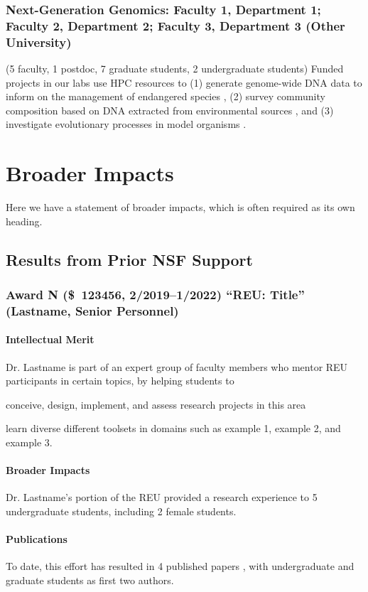 \documentclass[12pt]{nsf-proposal}
\newcommand{\dol}[2][]{\SI{#2}[\$]{#1}}
\begin{document}
\subsubsection{Next-Generation Genomics: Faculty 1, Department 1; Faculty 2, Department 2; Faculty 3, Department 3 (Other University)}

(5 faculty, 1 postdoc, 7 graduate students, 2 undergraduate students)
Funded projects in our labs use HPC resources to (1) generate genome-wide DNA data to inform on the management of endangered species \cite{torkamaneh2016}, (2) survey community composition based on DNA extracted from environmental sources \cite{watts2019}, and (3) investigate evolutionary processes in model organisms \cite{hurt2021}.

\section*{Broader Impacts}

Here we have a statement of broader impacts, which is often required as its own heading.

\subsection{Results from Prior NSF Support}

\subsubsection{Award N (\dol{123456}, 2/2019--1/2022) ``REU: Title'' (Lastname, Senior Personnel)}

\paragraph{Intellectual Merit}

Dr. Lastname is part of an expert group of faculty members who mentor REU participants in certain topics, by helping students to
\begin{enumerate*}[label=(\arabic*), itemjoin={{; }}, itemjoin*={{; and }}]
\item conceive, design, implement, and assess research projects in this area
\item learn diverse different toolsets in domains such as example 1, example 2, and example 3.
\end{enumerate*}

\paragraph{Broader Impacts}
Dr. Lastname's portion of the REU provided a research experience to 5 undergraduate students, including 2 female students.

\paragraph{Publications}
To date, this effort has resulted in 4 published papers \cite{paudel2019a,paudel2019b,paudel2018,mookiah2017}, with undergraduate and graduate students as first two authors.

\renewcommand{\bibname}{References Cited}
\printbibliography[heading=bibnumbered]
\end{document}
